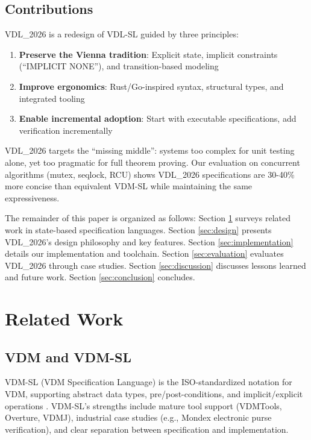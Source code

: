 \documentclass[conference]{IEEEtran}
\begin{document}
\subsection{Contributions}

VDL\_2026 is a redesign of VDL-SL guided by three principles:

\begin{enumerate}
\item \textbf{Preserve the Vienna tradition}: Explicit state, implicit constraints (``IMPLICIT NONE''), and transition-based modeling
\item \textbf{Improve ergonomics}: Rust/Go-inspired syntax, structural types, and integrated tooling
\item \textbf{Enable incremental adoption}: Start with executable specifications, add verification incrementally
\end{enumerate}

VDL\_2026 targets the ``missing middle'': systems too complex for unit testing alone, yet too pragmatic for full theorem proving. Our evaluation on concurrent algorithms (mutex, seqlock, RCU) shows VDL\_2026 specifications are 30-40\% more concise than equivalent VDM-SL while maintaining the same expressiveness.

The remainder of this paper is organized as follows: Section \ref{sec:related} surveys related work in state-based specification languages. Section \ref{sec:design} presents VDL\_2026's design philosophy and key features. Section \ref{sec:implementation} details our implementation and toolchain. Section \ref{sec:evaluation} evaluates VDL\_2026 through case studies. Section \ref{sec:discussion} discusses lessons learned and future work. Section \ref{sec:conclusion} concludes.

\section{Related Work}
\label{sec:related}

\subsection{VDM and VDM-SL}

VDM-SL (VDM Specification Language) is the ISO-standardized notation for VDM, supporting abstract data types, pre/post-conditions, and implicit/explicit operations \cite{fitzgerald2009}. VDM-SL's strengths include mature tool support (VDMTools, Overture, VDMJ), industrial case studies (e.g., Mondex electronic purse verification), and clear separation between specification and implementation.
\end{document}

